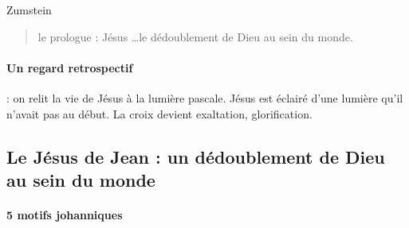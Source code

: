     Zumstein  \begin{quote}
        le prologue : Jésus \ldots le dédoublement de Dieu au sein du monde.
        
    \end{quote} 
    
    \paragraph{Un regard retrospectif} : on relit la vie de Jésus à la lumière pascale. Jésus est éclairé d'une lumière qu'il n'avait pas au début. La croix devient exaltation, glorification.
    
    \subsection{Le Jésus de Jean : un dédoublement de Dieu au sein du monde}
     
     \paragraph{5 motifs johanniques}
     
